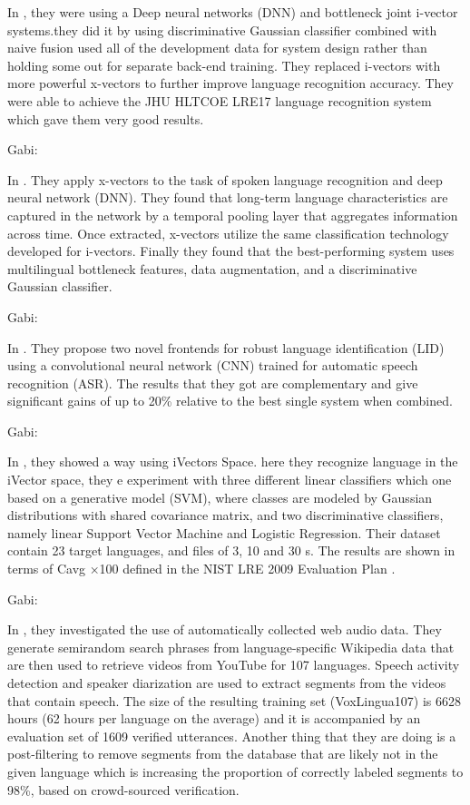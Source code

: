 \documentclass[a4paper]{article}
\begin{document}
In \cite{alan2018language}, they were using a Deep neural networks (DNN) and bottleneck joint i-vector systems.they did it by using discriminative Gaussian classifier combined with naive fusion used all of the development data for system  design rather than holding some out for separate back-end training. They replaced i-vectors with more powerful x-vectors to further improve language recognition accuracy. They were able to achieve the  JHU HLTCOE LRE17 language
recognition system which gave them very good results.

Gabi:

In \cite{david2018spoken}. They apply x-vectors to the task of spoken language recognition and deep
neural network (DNN). They found that long-term language characteristics are captured in the network by a temporal pooling layer that aggregates information
across time. Once extracted, x-vectors utilize the same
classification technology developed for i-vectors. Finally they found that the best-performing system uses multilingual bottleneck features, data augmentation, and a discriminative Gaussian classifier.

Gabi:

In \cite{yun2014application}. They propose  two novel frontends for robust language identification (LID) using a convolutional neural network (CNN) trained for automatic speech recognition (ASR).
The results that they got are complementary and give significant gains of up to 20\% relative to the best single system when combined.

Gabi:

In \cite{david2011language}, they showed a way using iVectors Space.
here they recognize language in the iVector space, they e experiment with three different linear classifiers which one based on a generative model (SVM), where classes are modeled by Gaussian distributions with shared covariance matrix, and two discriminative classifiers, namely linear Support Vector Machine and
Logistic Regression. Their dataset contain 23 target languages, and files of 3, 10 and 30 s. The results are shown in terms of Cavg ×100 defined in the NIST LRE 2009 Evaluation Plan \cite{NISTLRE2009EvaluationPlan}.

Gabi:

In \cite{Jorgen2020VOXLINGUA107}, they investigated the use of automatically collected web audio data. They generate semirandom search phrases from language-specific Wikipedia data that
are then used to retrieve videos from YouTube for 107 languages. Speech activity detection and speaker diarization are used to extract
segments from the videos that contain speech. The size of the resulting training set (VoxLingua107) is 6628 hours (62 hours per language on the average) and it is accompanied by an evaluation set of 1609 verified utterances. Another thing that they are doing is a post-filtering to remove segments from the database that are likely not in the given language which is increasing the proportion of correctly labeled segments to 98\%, based on crowd-sourced verification.
\end{document}
